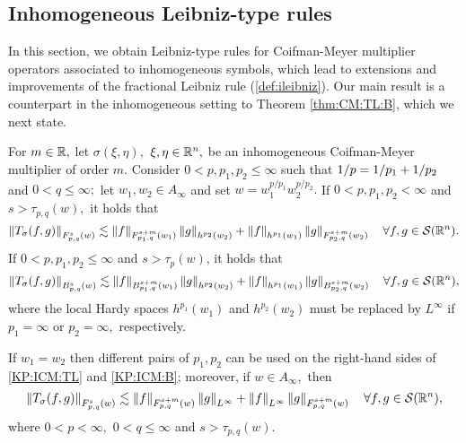  \subsection{Inhomogeneous Leibniz-type rules}
 In this section, we obtain Leibniz-type rules for Coifman-Meyer multiplier operators associated to inhomogeneous symbols, which lead to extensions and improvements of the fractional Leibniz rule (\ref{def:ileibniz}). Our main result is a counterpart in the inhomogeneous setting to Theorem \ref{thm:CM:TL:B}, which we next state.
 
\begin{theorem}\label{thm:ICM:TL:B}  For $m \in \re,$ let $\sigma(\xi,\eta),$ $\xi,\eta\in\rn,$ be an inhomogeneous Coifman-Meyer multiplier of order $m.$ Consider  $0 < p, p_1, p_2  \le \infty$  such that $\hcline$ and  $0 < q \leq \infty;$ let  $w_1,w_2\in A_\infty$ and set $w=w_1^{{p}/{p_1}} w_2^{{p}/{p_2}}.$ 
If $0 < p,p_1,p_2 < \infty$ and  $s > \tau_{p,q}(w),$  it holds that
\begin{equation}\label{KP:ICM:TL}
\norm{T_\sigma(f,g)}{\itlw{p}{s}{q}{w}} \lesssim \norm{f}{\itlw{p_1}{s+m}{q}{w_1}} \norm{g}{h^{p_2}(w_2)} +  \norm{f}{h^{p_1}(w_1)}   \norm{g}{\itlw{p_2}{s+m}{q}{w_2}} \quad \forall f, g \in \sw.
\end{equation}
If $0< p, p_1,p_2\leq \infty$ and $s > \tau_p(w)$, it holds that
\begin{equation}\label{KP:ICM:B}
\norm{T_\sigma(f,g)}{\ibesw{p}{s}{q}{w}} \lesssim \norm{f}{\ibesw{p_1}{s+m}{q}{w_1} } \norm{g}{h^{p_2}(w_2)} +  \norm{f}{h^{p_1}(w_1)}   \norm{g}{\ibesw{p_2}{s+m}{q}{w_2} } \quad \forall f, g \in \sw,
\end{equation}
where the local Hardy spaces $h^{p_1}(w_1)$ and $h^{p_2}(w_2)$ must be replaced by $L^\infty$ if $p_1=\infty$ or $p_2=\infty,$ respectively.

If $w_1=w_2$ then different pairs of $p_1, p_2$ can be used on the right-hand sides of \eqref{KP:ICM:TL} and \eqref{KP:ICM:B}; moreover, if $w\in A_\infty,$ then 
\begin{equation}\label{KP:ICM:TL2}
\norm{T_\sigma(f,g)}{\itlw{p}{s}{q}{w}} \lesssim \norm{f}{\itlw{p}{s+m}{q}{w} } \norm{g}{L^\infty} +  \norm{f}{L^\infty}   \norm{g}{\itlw{p}{s+m}{q}{w}} \quad \forall f, g \in \sw,
\end{equation}
where $0<p<\infty,$ $0<q\le\infty$ and $s>\tau_{p,q}(w).$
\end{theorem} 




